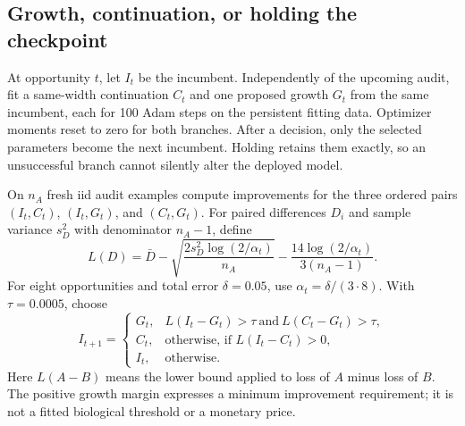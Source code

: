 \documentclass[11pt]{article}
\theoremstyle{remark}\newtheorem{remark}[theorem]{Remark}
\begin{document}
\subsection{Growth, continuation, or holding the checkpoint}
At opportunity $t$, let $I_t$ be the incumbent. Independently of the upcoming
audit, fit a same-width continuation $C_t$ and one proposed growth $G_t$ from
the same incumbent, each for 100 Adam steps on the persistent fitting data.
Optimizer moments reset to zero for both branches. After a decision, only
the selected parameters become the next incumbent. Holding retains them
exactly, so an unsuccessful branch cannot silently alter the deployed model.

On $n_A$ fresh iid audit examples compute improvements for the three ordered
pairs $(I_t,C_t)$, $(I_t,G_t)$, and $(C_t,G_t)$. For paired differences $D_i$
and sample variance $s_D^2$ with denominator $n_A-1$, define
\begin{equation}
 L(D)=\bar D-\sqrt{\frac{2s_D^2\log(2/\alpha_t)}{n_A}}
             -\frac{14\log(2/\alpha_t)}{3(n_A-1)}.
 \label{eq:eb-gate}
\end{equation}
For eight opportunities and total error $\delta=0.05$, use
$\alpha_t=\delta/(3\cdot8)$. With $\tau=0.0005$, choose
\begin{equation}
 I_{t+1}=\begin{cases}
 G_t,&L(I_t-G_t)>\tau\ \text{and}\ L(C_t-G_t)>\tau,\\
 C_t,&\text{otherwise, if }L(I_t-C_t)>0,\\
 I_t,&\text{otherwise}.
 \end{cases}
 \label{eq:decision}
\end{equation}
Here $L(A-B)$ means the lower bound applied to loss of $A$ minus loss of $B$.
The positive growth margin expresses a minimum improvement requirement; it
is not a fitted biological threshold or a monetary price.
\end{document}
